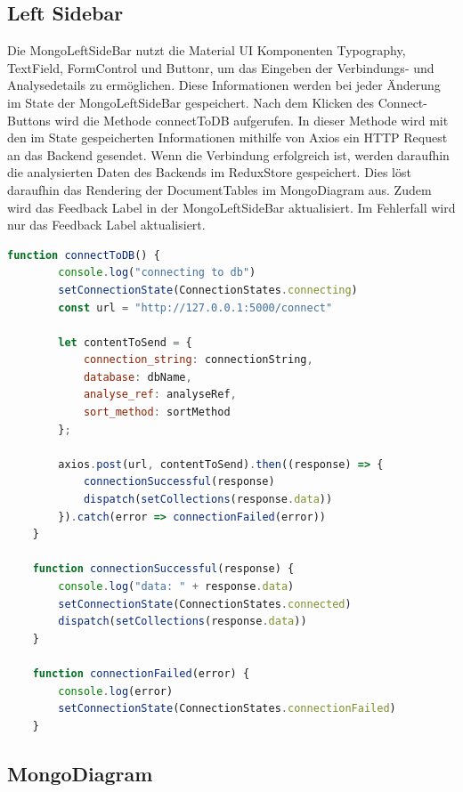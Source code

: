 \subsection{Left Sidebar}
\label{sub:fe_left_sidebar}

Die  MongoLeftSideBar nutzt die Material UI Komponenten Typography, TextField, FormControl und Buttonr, um das Eingeben der Verbindungs- und Analysedetails zu ermöglichen.
Diese Informationen werden bei jeder Änderung im State der MongoLeftSideBar gespeichert.
Nach dem Klicken des Connect-Buttons wird die Methode connectToDB aufgerufen.
In dieser Methode wird mit den im State gespeicherten Informationen mithilfe von Axios ein HTTP Request an das Backend gesendet.
Wenn die Verbindung erfolgreich ist, werden daraufhin die analysierten Daten des Backends im ReduxStore gespeichert.
Dies löst daraufhin das Rendering der DocumentTables im MongoDiagram aus.
Zudem wird das Feedback Label in der MongoLeftSideBar aktualisiert.
Im Fehlerfall wird nur das Feedback Label aktualisiert.


\begin{lstlisting}[language=JavaScript, caption={MongoLeftSideBar.connectToDB},label={lst:mongo_left_side_bar_connect_to_db}]
    function connectToDB() {
        console.log("connecting to db")
        setConnectionState(ConnectionStates.connecting)
        const url = "http://127.0.0.1:5000/connect"

        let contentToSend = {
            connection_string: connectionString,
            database: dbName,
            analyse_ref: analyseRef,
            sort_method: sortMethod
        };

        axios.post(url, contentToSend).then((response) => {
            connectionSuccessful(response)
            dispatch(setCollections(response.data))
        }).catch(error => connectionFailed(error))
    }

    function connectionSuccessful(response) {
        console.log("data: " + response.data)
        setConnectionState(ConnectionStates.connected)
        dispatch(setCollections(response.data))
    }

    function connectionFailed(error) {
        console.log(error)
        setConnectionState(ConnectionStates.connectionFailed)
    }
\end{lstlisting}

\subsection{MongoDiagram}
\label{sub:fe_mongo_diagram}

